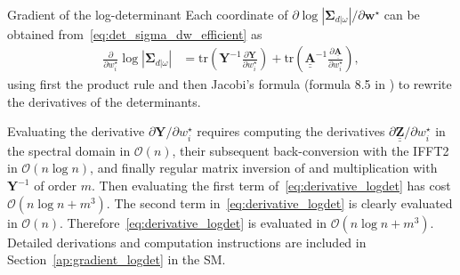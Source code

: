 \documentclass[12pt]{article}
\makeatletter
\let\oldparagraph\paragraph
\renewcommand{\paragraph}{
    \@ifstar
      \xxxParagraphStar
      \xxxParagraphNoStar
  }
\newcommand{\xxxParagraphStar}[1]{\oldparagraph*{#1}\mbox{}}
\newcommand{\xxxParagraphNoStar}[1]{\oldparagraph{#1}\mbox{}}
\newcommand{\mybcirc}[1] {\underline{\underline{\bm{#1}}}}
\makeatother
\begin{document}
\paragraph{Gradient of the log-determinant} \label{sec:gradient_log_determinant}
Each coordinate of $\partial \log |\bm{\Sigma}_{d|\omega}| / \partial \bm{w}^{\star}$ can be obtained from~\eqref{eq:det_sigma_dw_efficient} as
\begin{equation} \label{eq:derivative_logdet}
\begin{split}
    \frac{\partial}{\partial w_i^{\star}} \log |\bm{\Sigma}_{d|\omega}| 
    &= \mathrm{tr}\!\left(\bm{Y}^{-1} 
    \frac{\partial \bm{Y}}{\partial w_i^{\star}}\right) 
    + \mathrm{tr}\!\left(\mybcirc{A}^{-1} 
    \frac{\partial \mybcirc{A}}{\partial w_i^{\star}}\right), 
\end{split}
\end{equation}
using first the product rule and then Jacobi’s formula (formula 8.5 in \citet{Harville1997}) to rewrite the derivatives of the determinants.

Evaluating the derivative $\partial \bm{Y} / \partial w_i^{\star}$ requires computing the derivatives $\partial \mybcirc{Z} / \partial w_i^{\star}$ in the spectral domain in $\mathcal{O}(n)$, their subsequent back-conversion with the IFFT2 in $\mathcal{O}(n\log n)$, and finally regular matrix inversion of and multiplication with $\bm{Y}^{-1}$ of order $m$. Then evaluating the first term of~\eqref{eq:derivative_logdet} has cost $\mathcal{O}(n\log n + m^3)$.
The second term in~\eqref{eq:derivative_logdet} is clearly evaluated in $\mathcal{O}(n)$. Therefore~\eqref{eq:derivative_logdet} is evaluated in $\mathcal{O}(n \log n + m^3)$. Detailed derivations and computation instructions are included in Section~\ref{ap:gradient_logdet} in the SM.
\end{document}

